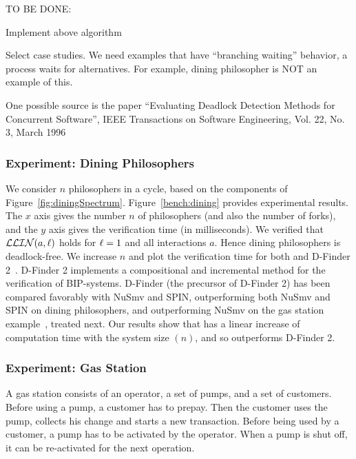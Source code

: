 TO BE DONE:
\bn

\item Implement above algorithm

\item Select case studies. We need examples that have ``branching
waiting'' behavior, \ie a process waits for alternatives. For example,
dining philosopher is NOT an example of this. 

One possible source is the paper 
``Evaluating Deadlock Detection Methods for Concurrent Software'', 
IEEE Transactions on Software Engineering, Vol. 22, No. 3, March 1996

\en




\subsubsection{Experiment: Dining Philosophers} 
We consider $n$ philosophers in a cycle, based on the components of Figure~\ref{fig:diningSpectrum}.
Figure~\ref{bench:dining} provides experimental results.
The $x$ axis gives the number $n$ of philosophers (and also the number of forks), 
and the $y$ axis gives the verification time (in
milliseconds).  We verified that $\mathcal{LLIN}(a, \ell)$ holds for
$\ell = 1$ and all interactions $a$. Hence dining philosophers is deadlock-free.
%
We increase $n$ and plot the verification
time for both \ldfctool and D-Finder 2~\cite{DFinder2}.
D-Finder 2 implements a compositional and incremental method for the
verification of BIP-systems. D-Finder
(the precursor of D-Finder 2) has been compared favorably with NuSmv and
SPIN, outperforming both  NuSmv and SPIN on
dining philosophers, and outperforming NuSmv on the gas station
example~\cite{bensalem2010compositional}, treated next.
%
Our results show that \ldfctool has a linear increase of computation time with the system size
$(n)$, and so outperforms D-Finder 2.


\subsubsection{Experiment: Gas Station}
A gas station \cite{gasstation} consists of an operator, %
a set of pumps, and a set of customers. 
Before using a pump, a customer has to prepay. Then the customer uses the
pump, collects his change and %
starts a new transaction.
%
Before being used by a customer, a pump has to be activated by the
operator.  When a pump is shut off, it can be re-activated for the
next operation.  


